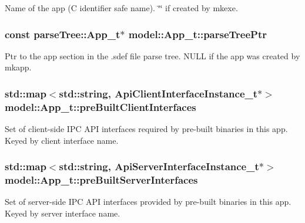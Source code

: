 Name of the app (C identifier safe name). \char`\"{}\char`\"{} if created by mkexe. 

\subsubsection[{\texorpdfstring{parse\+Tree\+Ptr}{parseTreePtr}}]{\setlength{\rightskip}{0pt plus 5cm}const {\bf parse\+Tree\+::\+App\+\_\+t}$\ast$ model\+::\+App\+\_\+t\+::parse\+Tree\+Ptr}\hypertarget{structmodel_1_1_app__t_ada7bc07eb497364997aa290c9df2abf0}{}\label{structmodel_1_1_app__t_ada7bc07eb497364997aa290c9df2abf0}
Ptr to the app section in the .sdef file parse tree. N\+U\+LL if the app was created by mkapp. 
\subsubsection[{\texorpdfstring{pre\+Built\+Client\+Interfaces}{preBuiltClientInterfaces}}]{\setlength{\rightskip}{0pt plus 5cm}std\+::map$<$std\+::string, {\bf Api\+Client\+Interface\+Instance\+\_\+t}$\ast$$>$ model\+::\+App\+\_\+t\+::pre\+Built\+Client\+Interfaces}\hypertarget{structmodel_1_1_app__t_ae73e4308135b01391bacc2ff355de163}{}\label{structmodel_1_1_app__t_ae73e4308135b01391bacc2ff355de163}
Set of client-\/side I\+PC A\+PI interfaces required by pre-\/built binaries in this app. Keyed by client interface name. 
\subsubsection[{\texorpdfstring{pre\+Built\+Server\+Interfaces}{preBuiltServerInterfaces}}]{\setlength{\rightskip}{0pt plus 5cm}std\+::map$<$std\+::string, {\bf Api\+Server\+Interface\+Instance\+\_\+t}$\ast$$>$ model\+::\+App\+\_\+t\+::pre\+Built\+Server\+Interfaces}\hypertarget{structmodel_1_1_app__t_a899c9e3a6bbb06ebf0d174be423792ec}{}\label{structmodel_1_1_app__t_a899c9e3a6bbb06ebf0d174be423792ec}
Set of server-\/side I\+PC A\+PI interfaces provided by pre-\/built binaries in this app. Keyed by server interface name. 
